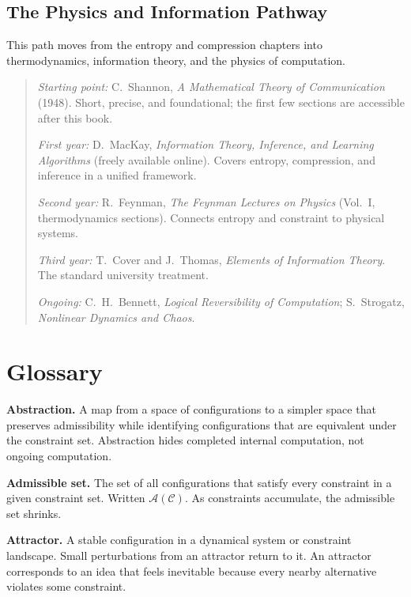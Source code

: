 \documentclass[11pt]{book}
\theoremstyle{plain}
\theoremstyle{definition}
\theoremstyle{remark}
\newenvironment{readinglist}
  {\begin{quote}\small}
  {\end{quote}}
\begin{document}
\section*{The Physics and Information Pathway}

This path moves from the entropy and compression chapters into
thermodynamics, information theory, and the physics of computation.

\begin{readinglist}
\textit{Starting point:} C.~Shannon, \textit{A Mathematical Theory of
Communication} (1948). Short, precise, and foundational; the first few
sections are accessible after this book.

\textit{First year:} D.~MacKay, \textit{Information Theory, Inference,
and Learning Algorithms} (freely available online). Covers entropy,
compression, and inference in a unified framework.

\textit{Second year:} R.~Feynman, \textit{The Feynman Lectures on
Physics} (Vol.~I, thermodynamics sections). Connects entropy and
constraint to physical systems.

\textit{Third year:} T.~Cover and J.~Thomas, \textit{Elements of
Information Theory}. The standard university treatment.

\textit{Ongoing:} C.~H.~Bennett, \textit{Logical Reversibility of
Computation}; S.~Strogatz, \textit{Nonlinear Dynamics and Chaos}.
\end{readinglist}

\chapter*{Glossary}

\textbf{Abstraction.} A map from a space of configurations to a simpler
space that preserves admissibility while identifying configurations that
are equivalent under the constraint set. Abstraction hides completed
internal computation, not ongoing computation.

\textbf{Admissible set.} The set of all configurations that satisfy
every constraint in a given constraint set. Written $\mathcal{A}(\mathcal{C})$.
As constraints accumulate, the admissible set shrinks.

\textbf{Attractor.} A stable configuration in a dynamical system or
constraint landscape. Small perturbations from an attractor return to it.
An attractor corresponds to an idea that feels inevitable because every
nearby alternative violates some constraint.
\end{document}

